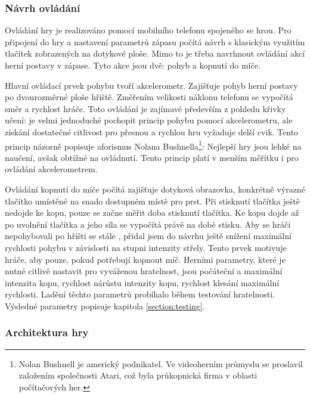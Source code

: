 \documentclass[thesis=B,czech,hidelinks]{FITthesis}[2012/06/26] %
\begin{document}
\subsubsection{Návrh ovládání}

Ovládání hry je realizováno pomocí mobilního telefonu spojeného se hrou. Pro připojení do hry a nastavení parametrů zápasu počítá návrh s klasickým využitím tlačítek zobrazených na dotykové ploše. Mimo to je třeba navrhnout ovládání akcí herní postavy v zápase. Tyto akce jsou dvě: pohyb a kopnutí do míče.

Hlavní ovládací prvek pohybu tvoří akcelerometr. Zajišťuje pohyb herní postavy po dvourozměrné ploše hřiště. Změřením velikosti náklonu telefonu se vypočítá směr a rychlost hráče. Toto ovládání je zajímavé především z pohledu křivky učení: je velmi jednoduché pochopit princip pohybu pomocí akcelerometru, ale získání dostatečné citlivost pro přesnou a rychlou hru vyžaduje delší cvik. Tento princip názorně popisuje aforismus Nolana Bushnella\footnote{Nolan Bushnell je americký podnikatel. Ve videoherním průmyslu se proslavil založením společnosti Atari, což byla průkopnická firma v oblasti počítačových her.\cite{atari}}: Nejlepší hry jsou lehké na naučení, avšak obtížné na ovládnutí. \cite{atari} Tento princip platí v menším měřítku i pro ovládání akcelerometrem.

Ovládání kopnutí do míče počítá zajišťuje dotyková obrazovka, konkrétně výrazné tlačítko umístěné na snado dostupném místě pro prst. Při stisknutí tlačítka ještě nedojde ke kopu, pouze se začne měřit doba stisknutí tlačítka. Ke kopu dojde až po uvolnění tlačítka a jeho síla se vypočítá právě na době stisku. Aby se hráči nepohybovali po hřišti se stále , přidal jsem do návrhu ještě snížení maximální rychlosti pohybu v závislosti na stupni intenzity střely. Tento prvek motivuje hráče, aby  pouze, pokud potřebují kopnout míč. Herními parametry, které je nutné citlivě nastavit pro vyváženou hratelnost, jsou počáteční a maximální intenzita kopu, rychlost nárůstu intenzity kopu, rychlost klesání maximální rychlosti. Ladění těchto parametrů probíhalo během testování hratelnosti. Výsledné parametry popisuje kapitola \ref{section:testing}.


\subsubsection{Architektura hry}
\end{document}

